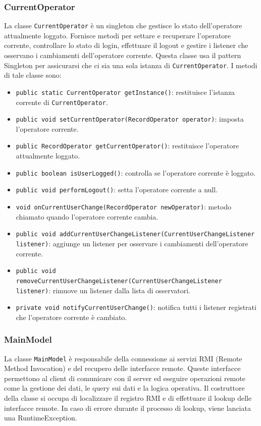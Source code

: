 \subsubsection{CurrentOperator}
La classe \texttt{CurrentOperator} è un singleton che gestisce lo stato dell'operatore attualmente loggato.
Fornisce metodi per settare e recuperare l'operatore corrente, controllare lo stato di login, effettuare il logout e gestire i listener che osservano i cambiamenti dell'operatore corrente.
Questa classe usa il pattern Singleton per assicurarsi che ci sia una sola istanza di \texttt{CurrentOperator}.
I metodi di tale classe sono:
\begin{itemize}
    \item \texttt{public static CurrentOperator getInstance()}: restituisce l'istanza corrente di \texttt{CurrentOperator}.
    \item \texttt{public void setCurrentOperator(RecordOperator operator)}: imposta l'operatore corrente.
    \item \texttt{public RecordOperator getCurrentOperator()}: restituisce l'operatore attualmente loggato.
    \item \texttt{public boolean isUserLogged()}: controlla se l'operatore corrente è loggato.
    \item \texttt{public void performLogout()}: setta l'operatore corrente a null.
    \item \texttt{void onCurrentUserChange(RecordOperator newOperator)}: metodo chiamato quando l'operatore corrente cambia.
    \item \texttt{public void addCurrentUserChangeListener(CurrentUserChangeListener listener)}: aggiunge un listener per osservare i cambiamenti dell'operatore corrente.
    \item \texttt{public void removeCurrentUserChangeListener(CurrentUserChangeListener listener)}: rimuove un listener dalla lista di osservatori.
    \item \texttt{private void notifyCurrentUserChange()}: notifica tutti i listener registrati che l'operatore corrente è cambiato.
\end{itemize}

\subsubsection{MainModel}
La classe \texttt{MainModel} è responsabile della connessione ai servizi RMI (Remote Method Invocation) e del recupero delle interfacce remote. Queste interfacce permettono al client di comunicare con il server ed eseguire operazioni remote come la gestione dei dati, le query sui dati e la logica operativa.
Il costruttore della classe si occupa di localizzare il registro RMI e di effettuare il lookup delle interfacce remote. In caso di errore durante il processo di lookup, viene lanciata una RuntimeException.

